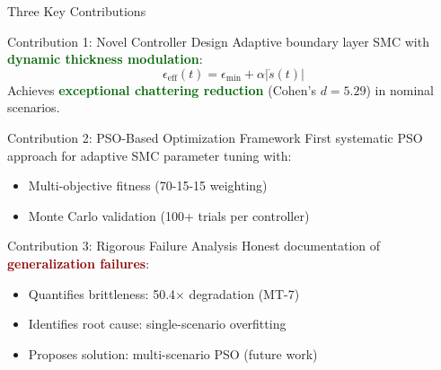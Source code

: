 \documentclass[10pt,aspectratio=169]{beamer}
\newcommand{\emphred}[1]{\textcolor{darkred}{\textbf{#1}}}
\newcommand{\emphgreen}[1]{\textcolor{darkgreen}{\textbf{#1}}}
\begin{document}
\begin{frame}{Three Key Contributions}
\begin{block}{Contribution 1: Novel Controller Design}
Adaptive boundary layer SMC with \emphgreen{dynamic thickness modulation}:
\[
\epsilon_{\text{eff}}(t) = \epsilon_{\min} + \alpha |\dot{s}(t)|
\]
Achieves \emphgreen{exceptional chattering reduction} (Cohen's $d = 5.29$) in nominal scenarios.
\end{block}

\begin{block}{Contribution 2: PSO-Based Optimization Framework}
First systematic PSO approach for adaptive SMC parameter tuning with:
\begin{itemize}
    \item Multi-objective fitness (70-15-15 weighting)
    \item Monte Carlo validation (100+ trials per controller)
\end{itemize}
\end{block}

\begin{block}{Contribution 3: Rigorous Failure Analysis}
Honest documentation of \emphred{generalization failures}:
\begin{itemize}
    \item Quantifies brittleness: 50.4$\times$ degradation (MT-7)
    \item Identifies root cause: single-scenario overfitting
    \item Proposes solution: multi-scenario PSO (future work)
\end{itemize}
\end{block}
\end{frame}
\end{document}
